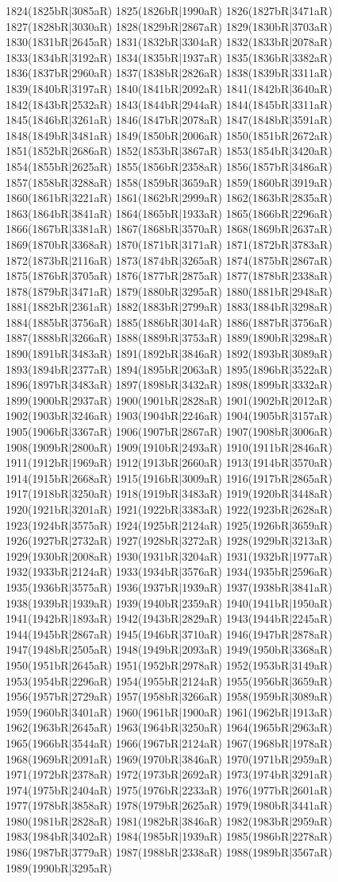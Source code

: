 1824(1825bR|3085aR) 1825(1826bR|1990aR) 1826(1827bR|3471aR) 1827(1828bR|3030aR) 1828(1829bR|2867aR) 1829(1830bR|3703aR) 1830(1831bR|2645aR) 1831(1832bR|3304aR) 1832(1833bR|2078aR) 1833(1834bR|3192aR) 1834(1835bR|1937aR) 1835(1836bR|3382aR) 1836(1837bR|2960aR) 1837(1838bR|2826aR) 1838(1839bR|3311aR) 1839(1840bR|3197aR) 1840(1841bR|2092aR) 1841(1842bR|3640aR) 1842(1843bR|2532aR) 1843(1844bR|2944aR) 1844(1845bR|3311aR) 1845(1846bR|3261aR) 1846(1847bR|2078aR) 1847(1848bR|3591aR) 1848(1849bR|3481aR) 1849(1850bR|2006aR) 1850(1851bR|2672aR) 1851(1852bR|2686aR) 1852(1853bR|3867aR) 1853(1854bR|3420aR) 1854(1855bR|2625aR) 1855(1856bR|2358aR) 1856(1857bR|3486aR) 1857(1858bR|3288aR) 1858(1859bR|3659aR) 1859(1860bR|3919aR) 1860(1861bR|3221aR) 1861(1862bR|2999aR) 1862(1863bR|2835aR) 1863(1864bR|3841aR) 1864(1865bR|1933aR) 1865(1866bR|2296aR) 1866(1867bR|3381aR) 1867(1868bR|3570aR) 1868(1869bR|2637aR) 1869(1870bR|3368aR) 1870(1871bR|3171aR) 1871(1872bR|3783aR) 1872(1873bR|2116aR) 1873(1874bR|3265aR) 1874(1875bR|2867aR) 1875(1876bR|3705aR) 1876(1877bR|2875aR) 1877(1878bR|2338aR) 1878(1879bR|3471aR) 1879(1880bR|3295aR) 1880(1881bR|2948aR) 1881(1882bR|2361aR) 1882(1883bR|2799aR) 1883(1884bR|3298aR) 1884(1885bR|3756aR) 1885(1886bR|3014aR) 1886(1887bR|3756aR) 1887(1888bR|3266aR) 1888(1889bR|3753aR) 1889(1890bR|3298aR) 1890(1891bR|3483aR) 1891(1892bR|3846aR) 1892(1893bR|3089aR) 1893(1894bR|2377aR) 1894(1895bR|2063aR) 1895(1896bR|3522aR) 1896(1897bR|3483aR) 1897(1898bR|3432aR) 1898(1899bR|3332aR) 1899(1900bR|2937aR) 1900(1901bR|2828aR) 1901(1902bR|2012aR) 1902(1903bR|3246aR) 1903(1904bR|2246aR) 1904(1905bR|3157aR) 1905(1906bR|3367aR) 1906(1907bR|2867aR) 1907(1908bR|3006aR) 1908(1909bR|2800aR) 1909(1910bR|2493aR) 1910(1911bR|2846aR) 1911(1912bR|1969aR) 1912(1913bR|2660aR) 1913(1914bR|3570aR) 1914(1915bR|2668aR) 1915(1916bR|3009aR) 1916(1917bR|2865aR) 1917(1918bR|3250aR) 1918(1919bR|3483aR) 1919(1920bR|3448aR) 1920(1921bR|3201aR) 1921(1922bR|3383aR) 1922(1923bR|2628aR) 1923(1924bR|3575aR) 1924(1925bR|2124aR) 1925(1926bR|3659aR) 1926(1927bR|2732aR) 1927(1928bR|3272aR) 1928(1929bR|3213aR) 1929(1930bR|2008aR) 1930(1931bR|3204aR) 1931(1932bR|1977aR) 1932(1933bR|2124aR) 1933(1934bR|3576aR) 1934(1935bR|2596aR) 1935(1936bR|3575aR) 1936(1937bR|1939aR) 1937(1938bR|3841aR) 1938(1939bR|1939aR) 1939(1940bR|2359aR) 1940(1941bR|1950aR) 1941(1942bR|1893aR) 1942(1943bR|2829aR) 1943(1944bR|2245aR) 1944(1945bR|2867aR) 1945(1946bR|3710aR) 1946(1947bR|2878aR) 1947(1948bR|2505aR) 1948(1949bR|2093aR) 1949(1950bR|3368aR) 1950(1951bR|2645aR) 1951(1952bR|2978aR) 1952(1953bR|3149aR) 1953(1954bR|2296aR) 1954(1955bR|2124aR) 1955(1956bR|3659aR) 1956(1957bR|2729aR) 1957(1958bR|3266aR) 1958(1959bR|3089aR) 1959(1960bR|3401aR) 1960(1961bR|1900aR) 1961(1962bR|1913aR) 1962(1963bR|2645aR) 1963(1964bR|3250aR) 1964(1965bR|2963aR) 1965(1966bR|3544aR) 1966(1967bR|2124aR) 1967(1968bR|1978aR) 1968(1969bR|2091aR) 1969(1970bR|3846aR) 1970(1971bR|2959aR) 1971(1972bR|2378aR) 1972(1973bR|2692aR) 1973(1974bR|3291aR) 1974(1975bR|2404aR) 1975(1976bR|2233aR) 1976(1977bR|2601aR) 1977(1978bR|3858aR) 1978(1979bR|2625aR) 1979(1980bR|3441aR) 1980(1981bR|2828aR) 1981(1982bR|3846aR) 1982(1983bR|2959aR) 1983(1984bR|3402aR) 1984(1985bR|1939aR) 1985(1986bR|2278aR) 1986(1987bR|3779aR) 1987(1988bR|2338aR) 1988(1989bR|3567aR) 1989(1990bR|3295aR) 